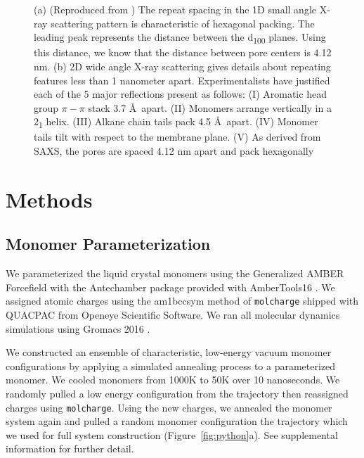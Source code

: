 \documentclass{article}
\begin{document}
\begin{figure}
\begin{subfigure}[t]{0.47\linewidth}
                \caption{}\label{fig:WAXS}
        \end{subfigure}
	\caption{(a) (Reproduced from \cite{feng_thin_2016}) The repeat spacing
		in the 1D small angle X-ray scattering pattern is characteristic of hexagonal
		packing. The leading peak represents the distance between the
		d\textsubscript{100} planes. Using this distance, we know that the distance
		between pore centers is 4.12 nm. (b) 2D wide angle X-ray scattering gives
		details about repeating features less than 1 nanometer apart. Experimentalists
		have justified each of the 5 major reflections present as follows: (I) Aromatic
		head group $\pi-\pi$ stack 3.7 \AA~apart.  (II) Monomers arrange vertically in
		a 2\textsubscript{1} helix. (III) Alkane chain tails pack 4.5 \AA~apart. (IV)
		Monomer tails tilt with respect to the membrane plane. (V) As derived from
		SAXS, the pores are spaced 4.12 nm apart and pack hexagonally}
	\label{fig:SWAXS}
 \end{figure}

  \section{Methods}
 
  \subsection{Monomer Parameterization}

  We parameterized the liquid crystal monomers using the Generalized AMBER
  Forcefield \cite{wang_development_2004} with the Antechamber package
  \cite{wang_automatic_2006} provided with AmberTools16
  \cite{case_ambertools16_2016}. We assigned atomic charges using the am1bccsym
  method of \texttt{molcharge} shipped with QUACPAC from Openeye Scientific
  Software. We ran all molecular dynamics simulations using Gromacs 2016
  \cite{bekker_gromacs:_1993,berendsen_gromacs:_1995,van_der_spoel_gromacs:_2005,hess_gromacs_2008}.

  We constructed an ensemble of characteristic, low-energy vacuum monomer
  configurations by applying a simulated annealing process to a
  parameterized monomer. We cooled monomers from 1000K to 50K over 10
  nanoseconds. We randomly pulled a low energy configuration from the
  trajectory then reassigned charges using \texttt{molcharge}. Using the new
  charges, we annealed the monomer system again and pulled a random monomer
  configuration the trajectory which we used for full system
  construction (Figure~\ref{fig:python}a). See supplemental information for
  further detail.
\end{document}
